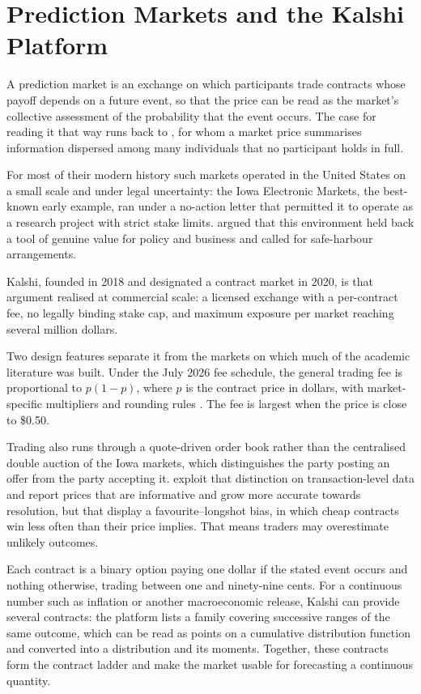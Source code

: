 \documentclass[12pt,a4paper]{report}
\begin{document}
\section{Prediction Markets and the Kalshi Platform}
\label{sec:setting-platform}

A prediction market is an exchange on which participants trade contracts whose
payoff depends on a future event, so that the price can be read as the
market's collective assessment of the probability that the event occurs. The
case for reading it that way runs back to \textcite{hayek1945}, for whom a
market price summarises information dispersed among many individuals that no
participant holds in full.

For most of their modern history such markets
operated in the United States on a small scale and under legal uncertainty:
the Iowa Electronic Markets, the best-known early example, ran under a
no-action letter that permitted it to operate as a research project with
strict stake limits. \textcite{arrow2008} argued that this environment held
back a tool of genuine value for policy and business and called for
safe-harbour arrangements.

Kalshi, founded in 2018 and designated a contract
market in 2020, is that argument realised at commercial scale: a licensed
exchange with a per-contract fee, no legally binding stake cap, and maximum
exposure per market reaching several million dollars.

Two design features separate it from the markets on which much of the academic
literature was built. Under the July 2026 fee schedule, the general trading fee
is proportional to $p(1-p)$, where $p$ is the contract price in dollars, with
market-specific multipliers and rounding rules \parencite{kalshi2026fees}. The
fee is largest when the price is close to \$0.50.

Trading also runs through a
quote-driven order book rather than the
centralised double auction of the Iowa markets, which
distinguishes the party posting an offer from the party accepting it.
\textcite{burgi2025} exploit that distinction on transaction-level data and
report prices that are informative and grow more accurate towards resolution,
but that display a favourite--longshot bias, in which cheap contracts win less
often than their price implies. That means traders may overestimate unlikely outcomes.

Each contract is a binary option paying one dollar if the stated event occurs
and nothing otherwise, trading between one and ninety-nine cents. For a
continuous number such as inflation or another macroeconomic release, Kalshi
can provide several contracts: the
platform lists a family covering successive ranges of the same outcome, which
can be read as points on a cumulative distribution function and converted into
a distribution and its moments. Together, these contracts form the contract
ladder and make the market usable for forecasting a continuous quantity.
\end{document}
